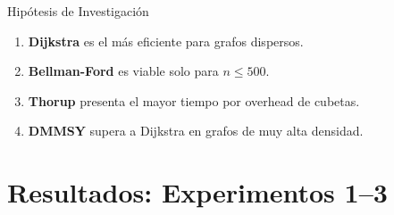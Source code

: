 \documentclass[aspectratio=169,12pt]{beamer}
\begin{document}
\begin{frame}{Hipótesis de Investigación}
  \begin{enumerate}
    \item[\textbf{H1}] \textbf{Dijkstra} es el más eficiente para grafos dispersos.
    \item[\textbf{H2}] \textbf{Bellman-Ford} es viable solo para $n\leq 500$.
    \item[\textbf{H3}] \textbf{Thorup} presenta el mayor tiempo por overhead de cubetas.
    \item[\textbf{H4}] \textbf{DMMSY} supera a Dijkstra en grafos de muy alta densidad.
  \end{enumerate}
\end{frame}

\section{Resultados: Experimentos 1--3}
\end{document}
